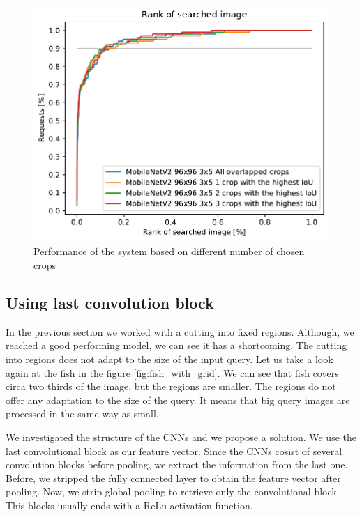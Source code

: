 \begin{figure}
\centering
\includegraphics[width=\textwidth]{graphs/5c4a781f8e6f3eac93db2083bde3963c06582a92a8141411bf29e41251a98e75.pdf}
\caption{Performance of the system based on different number of chosen crops}
\label{fig:crop_limitation}
\end{figure}


\subsection{Using last convolution block}


In the previous section we worked with a cutting into fixed regions. Although, we reached a good performing model, we can see it has a shortcoming. The cutting into regions does not adapt to the size of the input query. Let us take a look again at the fish in the figure \ref{fig:fish_with_grid}. We can see that fish covers circa two thirds of the image, but the regions are smaller. The regions do not offer any adaptation to the size of the query. It means that big query images are processed in the same way as small.

We investigated the structure of the CNNs and we propose a solution. We use the last convolutional block as our feature vector. Since the CNNs cosist of several convolution blocks before pooling, we extract the information from the last one. Before, we stripped the fully connected layer  to obtain the feature vector after pooling. Now, we strip global pooling to retrieve only the convolutional block. This blocks usually ends with a ReLu activation function.

